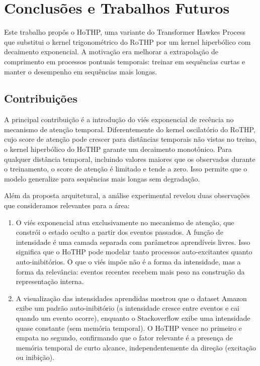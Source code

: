 \chapter{Conclusões e Trabalhos Futuros}
\label{chap:conclusoes-e-trabalhos-futuros}

Este trabalho propôs o HoTHP, uma variante do Transformer Hawkes Process que substitui o kernel trigonométrico do RoTHP por um kernel hiperbólico com decaimento exponencial. A motivação era melhorar a extrapolação de comprimento em processos pontuais temporais: treinar em sequências curtas e manter o desempenho em sequências mais longas.

\section{Contribuições}

A principal contribuição é a introdução do viés exponencial de recência no mecanismo de atenção temporal. Diferentemente do kernel oscilatório do RoTHP, cujo score de atenção pode crescer para distâncias temporais não vistas no treino, o kernel hiperbólico do HoTHP garante um decaimento monotônico. Para qualquer distância temporal, incluindo valores maiores que os observados durante o treinamento, o score de atenção é limitado e tende a zero. Isso permite que o modelo generalize para sequências mais longas sem degradação.

Além da proposta arquitetural, a análise experimental revelou duas observações que consideramos relevantes para a área:

\begin{enumerate}
    \item O viés exponencial atua exclusivamente no mecanismo de atenção, que constrói o estado oculto a partir dos eventos passados. A função de intensidade é uma camada separada com parâmetros aprendíveis livres. Isso significa que o HoTHP pode modelar tanto processos auto-excitantes quanto auto-inibitórios. O que o viés impõe não é a forma da intensidade, mas a forma da relevância: eventos recentes recebem mais peso na construção da representação interna.

    \item A visualização das intensidades aprendidas mostrou que o dataset Amazon exibe um padrão auto-inibitório (a intensidade cresce entre eventos e cai quando um evento ocorre), enquanto o Stackoverflow exibe uma intensidade quase constante (sem memória temporal). O HoTHP vence no primeiro e empata no segundo, confirmando que o fator relevante é a presença de memória temporal de curto alcance, independentemente da direção (excitação ou inibição).
\end{enumerate}

